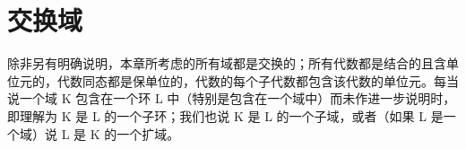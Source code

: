 \chapter{交换域}

除非另有明确说明，本章所考虑的所有域都是交换的；所有代数都是结合的且含单位元的，代数同态都是保单位的，代数的每个子代数都包含该代数的单位元。每当说一个域 K 包含在一个环 L 中（特别是包含在一个域中）而未作进一步说明时，即理解为 K 是 L 的一个子环；我们也说 K 是 L 的一个子域，或者（如果 L 是一个域）说 L 是 K 的一个扩域。

